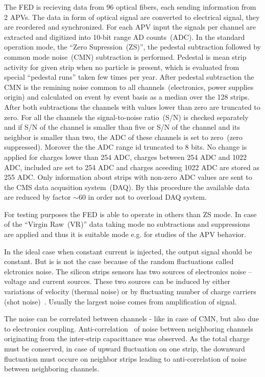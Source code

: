 The FED is recieving data from 96 optical fibers, each sending information from 2 APVs. The data in form of optical signal are converted to electrical signal, they are reordered and synchronized. For each APV input the signals per channel are extracted and digitized into 10-bit range AD counts~(ADC). In the standard operation mode, the ``Zero Supression~(ZS)'', the pedestal subtraction followed by common mode noise~(CMN) subtraction is performed. Pedestal is mean strip activity for given strip when no particle is present, which is evaluated from special ``pedestal runs'' taken few times per year. After pedestal subtraction the CMN is the remining noise common to all channels~(electronics, power supplies origin) and calculated on event by event basis as a median over the 128 strips. After both subtractions the channels with values lower than zero are truncated to zero. For all the channels the signal-to-noise ratio~(S/N) is checked separately and if S/N of the channel is smaller than five or S/N of the channel and its neighbor is smaller than two, the ADC of these channels is set to zero~(zero suppressed). Morover the the ADC range id truncated to 8 bits. No change is applied for charges lower than 254 ADC, charges between 254 ADC and 1022 ADC, included are set to 254 ADC and charges aceeding 1022 ADC are stored as 255 ADC. Only information about strips with non-zero ADC values are sent to the CMS data acqusition system~(DAQ). By this procedure the available data are reduced by factor $\sim$60 in order not to overload DAQ system.

For testing purposes the FED is able to operate in others than ZS mode. In case of the ``Virgin Raw~(VR)'' data taking mode no subtractions and suppressions are applied and thus it is suitable mode e.g. for studies of the APV behavior.

In the ideal case when constant current is injected, the output signal should be constant. But is is not the case because of the random fluctuations called elctronics noise. The silicon strips sensors has two sources of electronics noise -- voltage and current sources. These two sources can be induced by either variations of velocity (thermal noise) or by fluctuating number of charge carriers (shot noise)~\cite{website:noise}. Usually the largest noise comes from amplification of signal. 

The noise can be correlated between channels - like in case of CMN, but also due to electronics coupling. Anti-correlation~\cite{Lutz:1987wd} of noise between neighboring channels originating from the inter-strip capacittance was observed. As the total charge must be conserved, in case of upward fluctuation on one strip, the downward fluctuation must occure on neighbor strips leading to anti-correlation of noise between neighboring channels.

